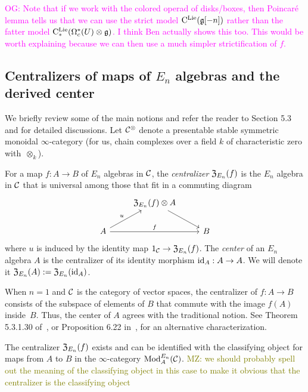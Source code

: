 \documentclass[11pt]{amsart}
\numberwithin{equation}{section}
\def\owen{\textcolor{magenta}{OG: }\textcolor{magenta}}
\def\mahmoud{\textcolor{olive}{MZ: }\textcolor{olive}}
\begin{document}
\owen{\label{note on little model} Note that if we work with the colored operad of disks/boxes, then Poincar\'e lemma tells us that we can use the strict model ${\rm C}^{\rm Lie}(\mathfrak g[-n])$ rather than the fatter model ${\rm C}^{\rm Lie}_*(\Omega^*_c(U) \otimes \mathfrak g)$. I think Ben actually shows this too. This would be worth explaining because we can then use a much simpler strictification of $f$.}

\subsection{Centralizers of maps of $E_n$ algebras and the derived center}
\label{sec: centralizer}

We briefly review some of the main notions and refer the reader to \cite{LurieHA} Section 5.3 and \cite{FrancisHH} for detailed discussions. Let $\mathcal C^\otimes$ denote a presentable stable symmetric monoidal $\infty$-category (for us, chain complexes over a field $k$ of characteristic zero with~$\otimes_k$).

\begin{dfn}\label{D:centralizer}
For a map $f: A \to B$ of $E_n$ algebras in $\mathcal C$, 
the {\em centralizer} ${\frak Z}_{E_n}(f)$ is the $E_n$ algebra in $\mathcal C$ that is universal among those that fit in a commuting diagram
\[
\begin{tikzcd}
& {\frak Z}_{E_n}(f) \otimes A \arrow[dr] & \\
A \arrow[ur, "u"] \arrow[rr, "f"] && B
\end{tikzcd}
\]
where $u$ is induced by the identity map $1_\mathcal C \to {\frak Z}_{E_n}(f)$.
The {\em center} of an $E_n$ algebra $A$ is the centralizer of its identity morphism ${\rm id}_A: A \to A$. We will denote it ${\frak Z}_{E_n}(A) 
:= {\frak Z}_{E_n}({\rm id}_A)$.
\end{dfn}
When $n=1$ and $\mathcal C$ is the category of vector spaces, the centralizer of $f: A \to B$ consists of the subspace of elements of $B$ that commute with the image $f(A)$ inside~$B$. Thus, the center of $A$ agrees with the traditional notion. See Theorem 5.3.1.30 of~\cite{LurieHA}, or Proposition 6.22 in~\cite{GTZ3}, for an alternative characterization.

\begin{prp}\label{T:centralizer=inthom} 
The centralizer ${\frak Z}_{E_n}(f)$ exists and can be identified with the classifying object for maps from $A$ to $B$ in the $\infty$-category ${\rm Mod}^{E_n}_A(\mathcal C)$. \mahmoud{we should probably spell out the meaning of the classifying object in this case to make it obvious that the centralizer is the classifying object}
\end{prp} 
\end{document}

